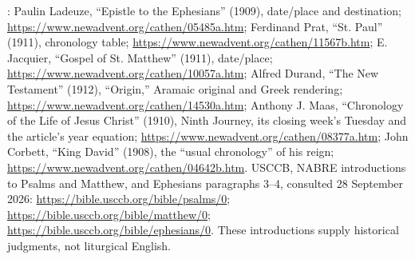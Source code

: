 \begin{description}[style=nextline,leftmargin=0pt,labelsep=0pt,itemsep=.35em]
\item[Chronology and historical setting]
: Paulin Ladeuze, ``Epistle to the
Ephesians'' (1909), date/place and destination;
\url{https://www.newadvent.org/cathen/05485a.htm}; Ferdinand Prat,
``St. Paul'' (1911), chronology table;
\url{https://www.newadvent.org/cathen/11567b.htm}; E. Jacquier,
``Gospel of St. Matthew'' (1911), date/place;
\url{https://www.newadvent.org/cathen/10057a.htm}; Alfred Durand,
``The New Testament'' (1912), ``Origin,'' Aramaic original and Greek
rendering; \url{https://www.newadvent.org/cathen/14530a.htm};
Anthony J. Maas, ``Chronology of the Life of Jesus Christ'' (1910),
Ninth Journey, its closing week's Tuesday and the article's year
equation; \url{https://www.newadvent.org/cathen/08377a.htm}; John
Corbett, ``King David'' (1908), the ``usual chronology'' of his reign;
\url{https://www.newadvent.org/cathen/04642b.htm}.
USCCB, NABRE introductions to Psalms and Matthew, and Ephesians
paragraphs 3--4, consulted 28 September 2026:
\url{https://bible.usccb.org/bible/psalms/0};
\url{https://bible.usccb.org/bible/matthew/0};
\url{https://bible.usccb.org/bible/ephesians/0}.
These introductions supply historical judgments, not liturgical English.
\end{description}
